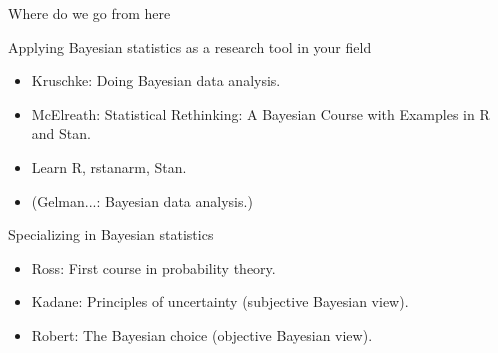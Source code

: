 \begin{frame}{Where do we go from here}

\begin{small}
  \begin{block}{Applying Bayesian statistics as a research tool in your field}
    \begin{itemize}
    \item Kruschke: Doing Bayesian data analysis.
    \item McElreath: Statistical Rethinking: A Bayesian Course with Examples in R and Stan.
    \item Learn R, rstanarm, Stan.
    \item (Gelman...: Bayesian data analysis.)
    \end{itemize}
  \end{block}
  
  \begin{alertblock}{Specializing in Bayesian statistics}
    \begin{itemize}
      \item Ross: First course in probability theory.
      \item Kadane: Principles of uncertainty (subjective Bayesian view).
      \item Robert: The Bayesian choice (objective Bayesian view).
    \end{itemize}

  \end{alertblock}

\end{small}

\end{frame}



